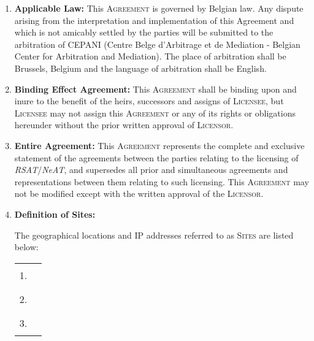 \documentclass[12pt]{article}
\newcommand{\RSAT}[0]{\emph{RSAT}\xspace}
\newcommand{\NeAT}[0]{\emph{NeAT}\xspace}
\newcommand{\Licensor}[0]{\textsc{Licensor}\xspace}
\newcommand{\Licensee}[0]{\textsc{Licensee}\xspace}
\newcommand{\Agreement}[0]{\textsc{Agreement}\xspace}
\newcommand{\Sites}[0]{\textsc{Sites}\xspace}
\newcommand{\Fillline}[0]{\rule{10cm}{1pt}}
\newcommand{\Paragraph}[2]{\item \textbf{#1:} #2}
\begin{document}
\begin{enumerate}
{    %
  }

  \Paragraph{Applicable Law}{This \Agreement is governed by Belgian law. Any
    dispute arising from the interpretation and implementation of this
    Agreement and which is not amicably settled by the parties will be
    submitted to the arbitration of CEPANI (Centre Belge d'Arbitrage et de
    Mediation - Belgian Center for Arbitration and Mediation). The place
    of arbitration shall be Brussels, Belgium and the language of
    arbitration shall be English.

  }

  \Paragraph{Binding Effect Agreement}{This \Agreement shall be binding 
    upon and inure to the benefit of the heirs, successors and assigns of 
    \Licensee, but \Licensee may not assign this \Agreement or any of its 
    rights or obligations hereunder without the prior written approval of 
    \Licensor.
  }

  \Paragraph{Entire Agreement}{This \Agreement represents the complete 
    and exclusive statement of the agreements between the parties 
    relating to the licensing of \RSAT/\NeAT, and supersedes all 
    prior and simultaneous agreements and representations between them 
    relating to such licensing. This \Agreement may not be modified except 
    with the written approval of the \Licensor.
  }

  \Paragraph{Definition of Sites}{

    The geographical locations and IP addresses referred to as \Sites are listed below:

\begin{center}
\begin{tabular}{lp{14cm}}
1.&\Fillline\\[5mm]
2.&\Fillline\\[5mm]
3.&\Fillline
\end{tabular}
\end{center}
}
\label{DefSites}



\end{enumerate}
\end{document}
